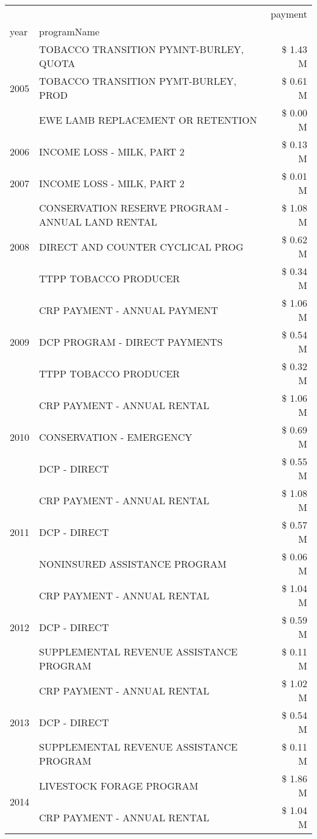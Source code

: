 \begin{tabular}{llr}
\toprule
 &  & payment \\
year & programName &  \\
\midrule
\multirow[t]{3}{*}{2005} & TOBACCO TRANSITION PYMNT-BURLEY, QUOTA & \$ 1.43 M \\
 & TOBACCO TRANSITION PYMT-BURLEY, PROD & \$ 0.61 M \\
 & EWE LAMB REPLACEMENT OR RETENTION & \$ 0.00 M \\
\cline{1-3}
2006 & INCOME LOSS - MILK, PART 2 & \$ 0.13 M \\
\cline{1-3}
2007 & INCOME LOSS - MILK, PART 2 & \$ 0.01 M \\
\cline{1-3}
\multirow[t]{3}{*}{2008} & CONSERVATION RESERVE PROGRAM - ANNUAL LAND RENTAL & \$ 1.08 M \\
 & DIRECT AND COUNTER CYCLICAL PROG & \$ 0.62 M \\
 & TTPP TOBACCO PRODUCER & \$ 0.34 M \\
\cline{1-3}
\multirow[t]{3}{*}{2009} & CRP PAYMENT - ANNUAL PAYMENT & \$ 1.06 M \\
 & DCP PROGRAM - DIRECT PAYMENTS & \$ 0.54 M \\
 & TTPP TOBACCO PRODUCER & \$ 0.32 M \\
\cline{1-3}
\multirow[t]{3}{*}{2010} & CRP PAYMENT - ANNUAL RENTAL & \$ 1.06 M \\
 & CONSERVATION - EMERGENCY & \$ 0.69 M \\
 & DCP - DIRECT & \$ 0.55 M \\
\cline{1-3}
\multirow[t]{3}{*}{2011} & CRP PAYMENT - ANNUAL RENTAL & \$ 1.08 M \\
 & DCP - DIRECT & \$ 0.57 M \\
 & NONINSURED ASSISTANCE PROGRAM & \$ 0.06 M \\
\cline{1-3}
\multirow[t]{3}{*}{2012} & CRP PAYMENT - ANNUAL RENTAL & \$ 1.04 M \\
 & DCP - DIRECT & \$ 0.59 M \\
 & SUPPLEMENTAL REVENUE ASSISTANCE PROGRAM & \$ 0.11 M \\
\cline{1-3}
\multirow[t]{3}{*}{2013} & CRP PAYMENT - ANNUAL RENTAL & \$ 1.02 M \\
 & DCP - DIRECT & \$ 0.54 M \\
 & SUPPLEMENTAL REVENUE ASSISTANCE PROGRAM & \$ 0.11 M \\
\cline{1-3}
\multirow[t]{3}{*}{2014} & LIVESTOCK FORAGE PROGRAM & \$ 1.86 M \\
 & CRP PAYMENT - ANNUAL RENTAL & \$ 1.04 M \\

\end{tabular}
